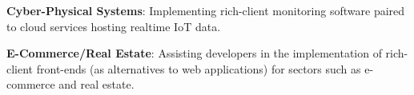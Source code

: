 \begin{frame}{}
{\begin{minipage}{.97\textwidth}
{\begin{enumerate}
\vspace{11pt}
\dmitem \textbf{Cyber-Physical Systems}:  \hspace{.25em} 
Implementing rich-client monitoring 
software paired to cloud services hosting 
realtime IoT data.

\vspace{11pt}
\dmitem \textbf{E-Commerce/Real Estate}:  \hspace{.25em} 
Assisting developers in the implementation of 
rich-client front-ends (as 
alternatives to web applications) for sectors such 
as e-commerce and real estate.
\end{enumerate}
}

\end{minipage}
}


\end{frame}
